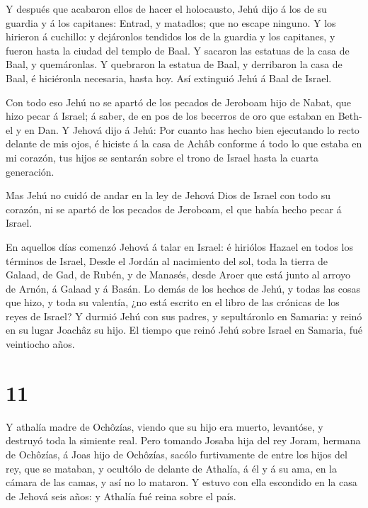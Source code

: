  Y después que acabaron ellos de hacer el holocausto, Jehú
dijo á los de su guardia y á los capitanes: Entrad, y matadlos; que no
escape ninguno. Y los hirieron á cuchillo: y dejáronlos tendidos los de
la guardia y los capitanes, y fueron hasta la ciudad del templo de Baal.
 Y sacaron las estatuas de la casa de Baal, y quemáronlas.
 Y quebraron la estatua de Baal, y derribaron la casa de
Baal, é hiciéronla necesaria, hasta hoy.  Así extinguió
Jehú á Baal de Israel.

 Con todo eso Jehú no se apartó de los pecados de Jeroboam
hijo de Nabat, que hizo pecar á Israel; á saber, de en pos de los
becerros de oro que estaban en Beth-el y en Dan.  Y Jehová
dijo á Jehú: Por cuanto has hecho bien ejecutando lo recto delante de
mis ojos, é hiciste á la casa de Achâb conforme á todo lo que estaba en
mi corazón, tus hijos se sentarán sobre el trono de Israel hasta la
cuarta generación.

 Mas Jehú no cuidó de andar en la ley de Jehová Dios de
Israel con todo su corazón, ni se apartó de los pecados de Jeroboam, el
que había hecho pecar á Israel.

 En aquellos días comenzó Jehová á talar en Israel: é
hiriólos Hazael en todos los términos de Israel,  Desde el
Jordán al nacimiento del sol, toda la tierra de Galaad, de Gad, de
Rubén, y de Manasés, desde Aroer que está junto al arroyo de Arnón, á
Galaad y á Basán.  Lo demás de los hechos de Jehú, y todas
las cosas que hizo, y toda su valentía, ¿no está escrito en el libro de
las crónicas de los reyes de Israel?  Y durmió Jehú con sus
padres, y sepultáronlo en Samaria: y reinó en su lugar Joachâz su hijo.
 El tiempo que reinó Jehú sobre Israel en Samaria, fué
veintiocho años.

\hypertarget{section-10}{%
\section{11}\label{section-10}}

 Y athalía madre de Ochôzías, viendo que su hijo era muerto,
levantóse, y destruyó toda la simiente real.  Pero tomando
Josaba hija del rey Joram, hermana de Ochôzías, á Joas hijo de Ochôzías,
sacólo furtivamente de entre los hijos del rey, que se mataban, y
ocultólo de delante de Athalía, á él y á su ama, en la cámara de las
camas, y así no lo mataron.  Y estuvo con ella escondido en
la casa de Jehová seis años: y Athalía fué reina sobre el país.

